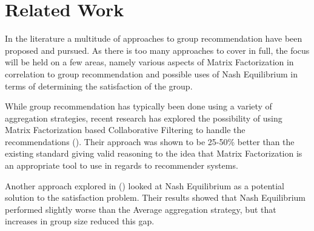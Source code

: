 \section{Related Work} \label{in:related_work}

In the literature a multitude of approaches to group recommendation have been proposed and pursued. As there is too many approaches to cover in full, the focus will be held on a few areas, namely various aspects of Matrix Factorization in correlation to group recommendation and possible uses of Nash Equilibrium in terms of determining the satisfaction of the group.

While group recommendation has typically been done using a variety of aggregation strategies, recent research has explored the possibility of using Matrix Factorization based Collaborative Filtering to handle the recommendations (). Their approach was shown to be 25-50\% better than the existing standard giving valid reasoning to the idea that Matrix Factorization is an appropriate tool to use in regards to recommender systems.

Another approach explored in () looked at Nash Equilibrium as a potential solution to the satisfaction problem. Their results showed that Nash Equilibrium performed slightly worse than the Average aggregation strategy, but that increases in group size reduced this gap.